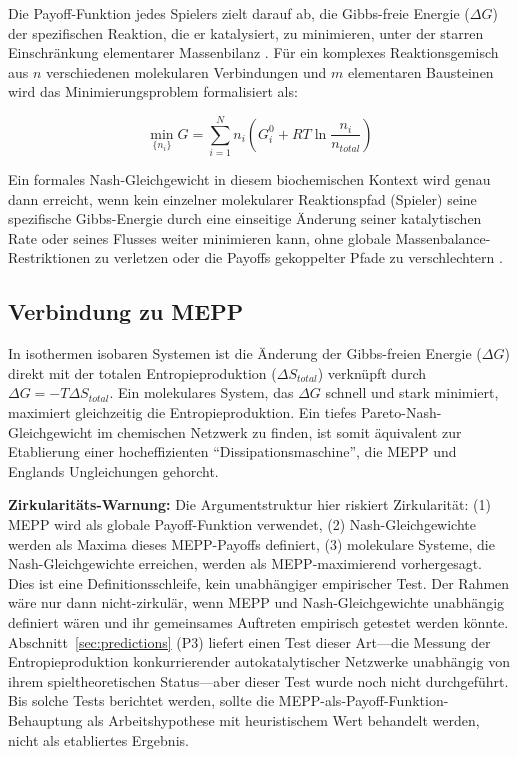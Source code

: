 \documentclass[12pt,a4paper]{article}
\theoremstyle{remark}
\begin{document}
Die Payoff-Funktion jedes Spielers zielt darauf ab, die Gibbs-freie Energie ($\Delta G$) der spezifischen Reaktion, die er katalysiert, zu minimieren, unter der starren Einschr\"ankung elementarer Massenbilanz \citep{MetabolicNash}. F\"ur ein komplexes Reaktionsgemisch aus $n$ verschiedenen molekularen Verbindungen und $m$ elementaren Bausteinen wird das Minimierungsproblem formalisiert als:

\begin{equation}
\min_{\{n_i\}} G = \sum_{i=1}^{N} n_i \left( G_i^0 + RT \ln\frac{n_i}{n_{total}} \right)
\end{equation}

Ein formales Nash-Gleichgewicht in diesem biochemischen Kontext wird genau dann erreicht, wenn kein einzelner molekularer Reaktionspfad (Spieler) seine spezifische Gibbs-Energie durch eine einseitige \"Anderung seiner katalytischen Rate oder seines Flusses weiter minimieren kann, ohne globale Massenbalance-Restriktionen zu verletzen oder die Payoffs gekoppelter Pfade zu verschlechtern \citep{MetabolicNash}.

\subsection{Verbindung zu MEPP}

In isothermen isobaren Systemen ist die \"Anderung der Gibbs-freien Energie ($\Delta G$) direkt mit der totalen Entropieproduktion ($\Delta S_{total}$) verkn\"upft durch $\Delta G = -T\Delta S_{total}$. Ein molekulares System, das $\Delta G$ schnell und stark minimiert, maximiert gleichzeitig die Entropieproduktion. Ein tiefes Pareto-Nash-Gleichgewicht im chemischen Netzwerk zu finden, ist somit \"aquivalent zur Etablierung einer hocheffizienten ``Dissipationsmaschine'', die MEPP und Englands Ungleichungen gehorcht.

\textbf{Zirkularit\"ats-Warnung:} Die Argumentstruktur hier riskiert Zirkularit\"at: (1) MEPP wird als globale Payoff-Funktion verwendet, (2) Nash-Gleichgewichte werden als Maxima dieses MEPP-Payoffs definiert, (3) molekulare Systeme, die Nash-Gleichgewichte erreichen, werden als MEPP-maximierend vorhergesagt. Dies ist eine Definitionsschleife, kein unabh\"angiger empirischer Test. Der Rahmen w\"are nur dann nicht-zirkul\"ar, wenn MEPP und Nash-Gleichgewichte unabh\"angig definiert w\"aren und ihr gemeinsames Auftreten empirisch getestet werden k\"onnte. Abschnitt~\ref{sec:predictions} (P3) liefert einen Test dieser Art---die Messung der Entropieproduktion konkurrierender autokatalytischer Netzwerke unabh\"angig von ihrem spieltheoretischen Status---aber dieser Test wurde noch nicht durchgef\"uhrt. Bis solche Tests berichtet werden, sollte die MEPP-als-Payoff-Funktion-Behauptung als Arbeitshypothese mit heuristischem Wert behandelt werden, nicht als etabliertes Ergebnis.
\end{document}
